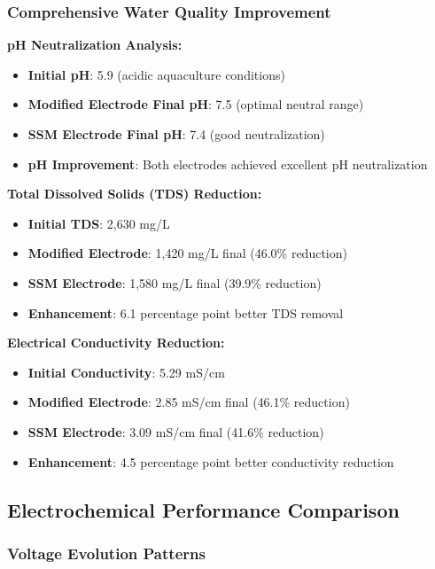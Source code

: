 \documentclass[12pt,a4paper]{article}
\begin{document}
\subsubsection{Comprehensive Water Quality Improvement}

\textbf{pH Neutralization Analysis:}
\begin{itemize}
    \item \textbf{Initial pH}: 5.9 (acidic aquaculture conditions)
    \item \textbf{Modified Electrode Final pH}: 7.5 (optimal neutral range)
    \item \textbf{SSM Electrode Final pH}: 7.4 (good neutralization)
    \item \textbf{pH Improvement}: Both electrodes achieved excellent pH neutralization
\end{itemize}

\textbf{Total Dissolved Solids (TDS) Reduction:}
\begin{itemize}
    \item \textbf{Initial TDS}: 2,630 mg/L
    \item \textbf{Modified Electrode}: 1,420 mg/L final (46.0\% reduction)
    \item \textbf{SSM Electrode}: 1,580 mg/L final (39.9\% reduction)
    \item \textbf{Enhancement}: 6.1 percentage point better TDS removal
\end{itemize}

\textbf{Electrical Conductivity Reduction:}
\begin{itemize}
    \item \textbf{Initial Conductivity}: 5.29 mS/cm
    \item \textbf{Modified Electrode}: 2.85 mS/cm final (46.1\% reduction)
    \item \textbf{SSM Electrode}: 3.09 mS/cm final (41.6\% reduction)
    \item \textbf{Enhancement}: 4.5 percentage point better conductivity reduction
\end{itemize}

\subsection{Electrochemical Performance Comparison}

\subsubsection{Voltage Evolution Patterns}
\end{document}
